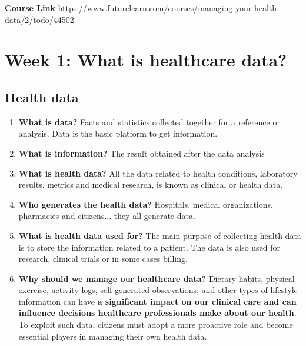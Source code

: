 \documentclass[10pt, twoside]{article}   	%
\begin{document}
\restoregeometry %
\nopagecolor%

\raggedbottom

\newpage
\tableofcontents %
\vfill
\noindent
\listoffigures
\vfill
\noindent
\textbf{Course Link} \url{https://www.futurelearn.com/courses/managing-your-health-data/2/todo/44502} 
\pagebreak
\section{Week 1: What is healthcare data?}
\subsection{Health data}
\begin{enumerate}
\item \textbf{What is data?} Facts and statistics collected together for a reference or analysis. Data is the basic platform to get information. 
\item \textbf{What is information?} The result obtained after the data analysis
\item \textbf{What is health data?}  All the data related to health conditions, laboratory results, metrics and medical research, is known as clinical or health data.
\item \textbf{Who generates the health data?} Hospitals, medical organizations, pharmacies and citizens... they all generate data. 
\item \textbf{What is health data used for?} The main purpose of collecting health data is to store the information related to a patient. The data is also used for research, clinical trials or in some cases billing.
\item \textbf{Why should we manage our healthcare data?} Dietary habits, physical exercise, activity logs, self-generated observations, and other types of lifestyle information can have \textbf{a significant impact on our clinical care and can influence decisions healthcare professionals make about our health}. To exploit such data, citizens must adopt a more proactive role and become essential players in managing their own health data.
\end {enumerate}
\end{document}

